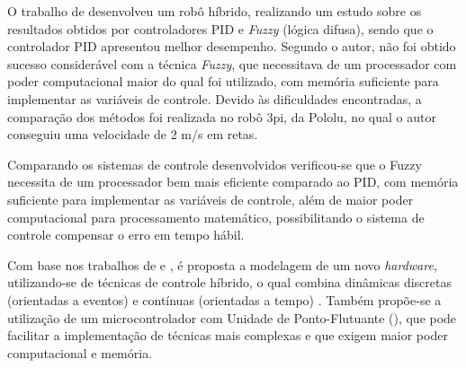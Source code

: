 \begin{comment}
O trabalho de \citeonline{alemao} desenvolveu um robô híbrido, realizando um estudo sobre os resultados obtidos por controladores
 PID e \textit{Fuzzy} (lógica difusa), sendo que o controlador PID apresentou um melhor desempenho. Segundo o autor, não foi 
obtido sucesso considerável com a técnica \textit{Fuzzy}, sendo que foram necessários ajustes para esta funcionar, 
o que acarretou em um sistema mais lento.
 Devido à baixa capacidade de armazenamento, a comparação dos métodos foi 
realizada no robô 3pi, da Pololu\textregistered, no qual o autor conseguiu uma velocidade de 2 m/s em retas.
\end{comment}
O trabalho de  desenvolveu um robô híbrido, realizando um estudo sobre os resultados obtidos por controladores
 PID e \textit{Fuzzy} (lógica difusa), sendo que o controlador PID apresentou melhor desempenho. Segundo o autor, não foi 
obtido sucesso considerável com a técnica \textit{Fuzzy}, que necessitava de um processador com poder computacional maior 
do qual foi utilizado, com memória suficiente para implementar as variáveis de controle.
 Devido às dificuldades encontradas, a comparação dos métodos foi 
realizada no robô 3pi, da Pololu, %
no qual o autor conseguiu uma velocidade de 2 m/s em retas. \par

Comparando os sistemas de controle desenvolvidos verificou-se que o Fuzzy
necessita de um processador bem mais eficiente comparado ao PID, com memória
suficiente para implementar as variáveis de controle, além de maior poder
computacional para processamento matemático, possibilitando o sistema de controle
compensar o erro em tempo hábil.

Com base nos trabalhos de  e , é proposta a modelagem de um novo 
\textit{hardware}, utilizando-se de técnicas de controle híbrido, o qual combina dinâmicas discretas (orientadas a 
eventos) e contínuas (orientadas a tempo) \cite{cassandras}. Também 
propõe-se a utilização de um microcontrolador com Unidade de Ponto-Flutuante 
(), que pode facilitar a implementação de técnicas mais complexas e 
que exigem maior poder computacional e memória.


\begin{spacing}{2}\end{spacing}
